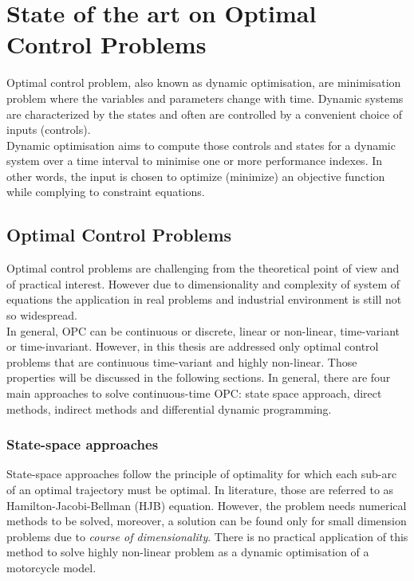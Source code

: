 \section{State of the art on Optimal Control Problems} 

Optimal control problem, also known as dynamic optimisation, are minimisation problem where the variables and parameters change with time. Dynamic systems are characterized by the states and often are controlled by a convenient choice of inputs (controls).\\
Dynamic optimisation aims to compute those controls and states for a dynamic system over a time interval to minimise one or more performance indexes. In other words, the input is chosen to optimize (minimize) an objective function while complying to constraint equations.

\subsection{Optimal Control Problems}
Optimal control problems are challenging from the theoretical point of view and of practical interest. However due to dimensionality and complexity of system of equations the application in real problems and industrial environment is still not so widespread.\\
In general, OPC can be continuous or discrete, linear or non-linear, time-variant or time-invariant. However, in this thesis are addressed only optimal control problems that are continuous time-variant and highly non-linear. Those properties will be discussed in the following sections. %
In general, there are four main approaches to solve continuous-time OPC: state space approach, direct methods, indirect methods and differential dynamic programming.


\subsubsection{State-space approaches}

State-space approaches follow the principle of optimality for which each sub-arc of an optimal trajectory must be optimal. In literature, those are referred to as Hamilton-Jacobi-Bellman (HJB) equation. However, the problem needs numerical methods to be solved, moreover, a solution can be found only for small dimension problems due to \textit{course of dimensionality}. There is no practical application of this method to solve highly non-linear problem as a dynamic optimisation of a motorcycle model.

